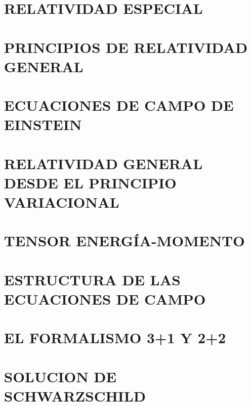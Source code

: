 \documentclass[../main]{subfiles}
\begin{document}
\chapter{RELATIVIDAD ESPECIAL}


\newpage

\chapter{PRINCIPIOS DE RELATIVIDAD GENERAL}


\newpage


\chapter{ECUACIONES DE CAMPO DE EINSTEIN}

\newpage


\chapter{RELATIVIDAD GENERAL DESDE EL PRINCIPIO VARIACIONAL}

\newpage


\chapter{TENSOR ENERGÍA-MOMENTO}

\newpage


\chapter{ESTRUCTURA DE LAS ECUACIONES DE CAMPO}

\newpage


\chapter{EL FORMALISMO 3+1 Y 2+2}

\newpage


\chapter{SOLUCION DE SCHWARZSCHILD}

\newpage
\end{document}
